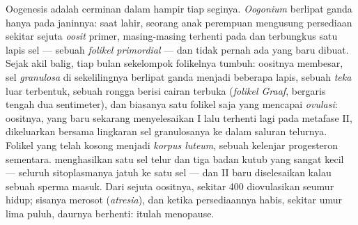 \begin{definition}\label{def:b2:mammal-reproduction:ovary}
Oogenesis adalah cerminan  dalam hampir tiap seginya.
\emph{Oogonium} berlipat ganda hanya pada janinnya: saat lahir, seorang
anak perempuan mengusung persediaan sekitar sejuta \emph{oosit} primer,
masing-masing terhenti pada   dan terbungkus satu
lapis sel --- sebuah \emph{folikel primordial} --- dan tidak pernah ada
yang baru dibuat. Sejak akil balig, tiap bulan sekelompok folikelnya
tumbuh: oositnya membesar, sel \emph{granulosa} di sekelilingnya
berlipat ganda menjadi beberapa lapis, sebuah \emph{teka} luar
terbentuk, sebuah rongga berisi cairan terbuka (\emph{folikel Graaf},
bergaris tengah dua sentimeter), dan biasanya satu folikel saja yang
mencapai \emph{ovulasi}: oositnya, yang baru sekarang menyelesaikan
 I lalu terhenti lagi pada metafase II, dikeluarkan bersama
lingkaran sel granulosanya ke dalam saluran telurnya. Folikel yang
telah kosong menjadi \emph{korpus luteum}, sebuah kelenjar progesteron
sementara.  menghasilkan satu sel telur dan tiga badan kutub
yang sangat kecil --- seluruh sitoplasmanya jatuh ke satu sel --- dan
 II baru diselesaikan kalau sebuah sperma masuk. Dari sejuta
oositnya, sekitar \num{400} diovulasikan seumur hidup; sisanya merosot
(\emph{atresia}), dan ketika persediaannya habis, sekitar umur lima
puluh, daurnya berhenti: itulah menopause.
\end{definition}

